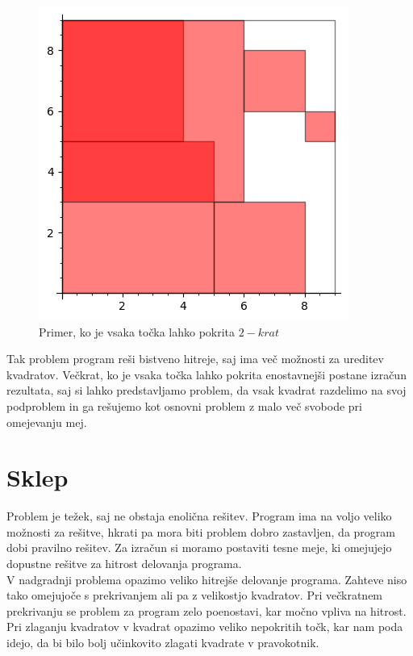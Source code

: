 \documentclass[a4paper, 11pt]{article}
\begin{document}
\begin{figure}[H]
    \centering
    \includegraphics{Dvakratno_prekrivanje.png}
    \caption{Primer, ko je vsaka točka lahko pokrita $2-krat$}
\end{figure}

\noindent Tak problem program reši bistveno hitreje, saj ima več možnosti za ureditev kvadratov. Večkrat,
ko je vsaka točka lahko pokrita enostavnejši postane izračun rezultata, saj si lahko predstavljamo problem,
da vsak kvadrat razdelimo na svoj podproblem in ga rešujemo kot osnovni problem z malo več svobode pri
omejevanju mej.

\section{Sklep}
Problem je težek, saj ne obstaja enolična rešitev. Program ima na voljo veliko možnosti za rešitve, hkrati
pa mora biti problem dobro zastavljen, da program dobi pravilno rešitev. Za izračun si moramo postaviti tesne
meje, ki omejujejo dopustne rešitve za hitrost delovanja programa.\\
V nadgradnji problema opazimo veliko hitrejše delovanje programa. Zahteve niso tako omejujoče s prekrivanjem 
ali pa z velikostjo kvadratov. Pri večkratnem prekrivanju se problem za program zelo poenostavi, kar močno
vpliva na hitrost.\\
Pri zlaganju kvadratov v kvadrat opazimo veliko nepokritih točk, kar nam poda idejo, da bi bilo bolj
učinkovito zlagati kvadrate v pravokotnik.
\end{document}
